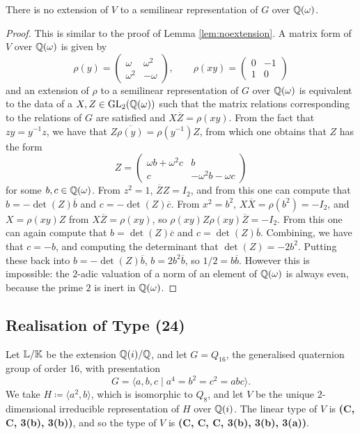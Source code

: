 \begin{lemma}\label{lem:noextension23}
    There is no extension of $V$ to a semilinear representation of $G$ over ${\mathbb Q}(\omega)$.
\end{lemma}

\begin{proof}
This is similar to the proof of Lemma \ref{lem:noextension}. A matrix form of $V$ over ${\mathbb Q}(\omega)$ is given by 
\[
\rho(y) = \begin{pmatrix}
    \omega & \omega^2 \\ \omega^2 & -\omega
\end{pmatrix}, \qquad
\rho(xy) = \begin{pmatrix}
    0 & -1 \\ 1 & 0
\end{pmatrix}
\]
and an extension of $\rho$ to a semilinear representation of $G$ over ${\mathbb Q}(\omega)$ is equivalent to the data of a $X,Z \in \operatorname{GL}_2({\mathbb Q}(\omega))$ such that the matrix relations corresponding to the relations of $G$ are satisfied and $X\overline{Z} = \rho(xy)$. From the fact that $zy = y^{-1}z$, we have that $Z \overline{\rho(y)} = \rho(y^{-1}) Z$, from which one obtains that $Z$ has the form 
\[
Z = \begin{pmatrix}
    \omega b + \omega^2 c & b \\ c & -\omega^2 b - \omega c
\end{pmatrix}
\]
for some $b,c \in {\mathbb Q}(\omega)$. From $z^2 = 1$, $\overline{Z} Z = I_2$, and from this one can compute that $b = -\det(Z)\overline{b}$ and $c = - \det(Z) \overline{c}$. From $x^2 = b^2$, $X \overline{X} = \rho(b^2) = - I_2$, and $X = \rho(xy)Z$ from $X\overline{Z} = \rho(xy)$, so $\rho(xy) Z \rho(xy) \overline{Z} = -I_2$. From this one can again compute that $b = \det(Z) \overline{c}$ and $c = \det(Z) \overline{b}$. Combining, we have that $c = -b$, and computing the determinant that $\det(Z) = -2 b^2$. Putting these back into $b = -\det(Z) \overline{b}$, $b = 2b^2\overline{b}$, so $1/2 = b \overline{b}$. However this is impossible: the $2$-adic valuation of a norm of an element of ${\mathbb Q}(\omega)$ is always even, because the prime $2$ is inert in ${\mathbb Q}(\omega)$.
\end{proof}

\subsection{Realisation of Type (24)}

Let ${\mathbb L} / {\mathbb K}$ be the extension ${\mathbb Q}(i) / {\mathbb Q}$, and let $G = Q_{16}$, the generalised quaternion group of order 16, with presentation
\[
G = \langle a,b,c \mid a^4 = b^2 = c^2 = abc \rangle.
\]
We take $H \coloneqq \langle a^2, b \rangle$, which is isomorphic to $Q_8$, and let $V$ be the unique $2$-dimensional irreducible representation of $H$ over ${\mathbb Q}(i)$. The linear type of $V$ is \textbf{(C, C, 3(b), 3(b))}, and so the type of $V$ is \textbf{(C, C, C, 3(b), 3(b), 3(a))}.

